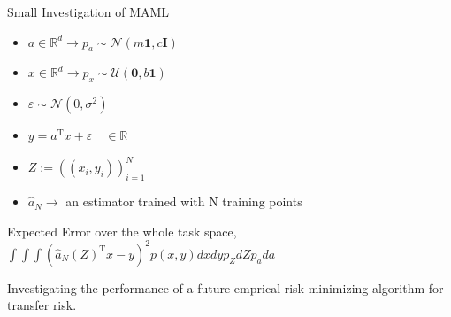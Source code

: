 \begin{frame}{Small Investigation of MAML \cite{Finn2017}}
  \begin{minipage}{0.5\textwidth}
    \begin{itemize}
      \item $ a \in \mathbb{R}^d \to p_a \sim \mathcal{N}(m\mathbf{1},c\mathbf{I})$
      \item $ x \in \mathbb{R}^d \to p_x \sim \mathcal{U}(\mathbf{0},b\mathbf{1})$
      \item $ \varepsilon \sim \mathcal{N}(0,\sigma^2)$
      \item $ y = a^\text{T}x + \varepsilon \quad \in \mathbb{R}$
      \item $ Z:= ((x_i,y_i))_{i=1}^N$
      \item $ \hat{a}_N \to $ an estimator trained with N training points
    \end{itemize}
  \end{minipage}%
  \begin{minipage}{0.5\textwidth}
    Expected Error over the whole task space,
      $ \int \int \int (\hat{a}_N(Z)^{\text{T}}x-y)^2p(x,y)dxdyp_ZdZp_ada$
  \end{minipage}
  \color{Pink} Investigating the performance of a future emprical risk minimizing algorithm for transfer risk.
\end{frame}

